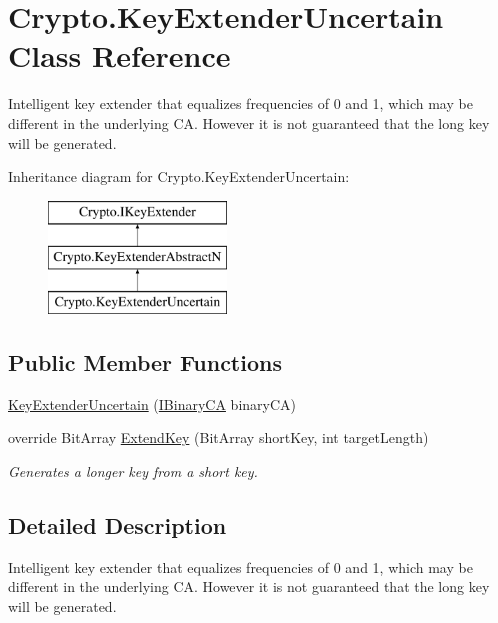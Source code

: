 \hypertarget{class_crypto_1_1_key_extender_uncertain}{}\section{Crypto.\+Key\+Extender\+Uncertain Class Reference}
\label{class_crypto_1_1_key_extender_uncertain}


Intelligent key extender that equalizes frequencies of 0 and 1, which may be different in the underlying C\+A. However it is not guaranteed that the long key will be generated.  


Inheritance diagram for Crypto.\+Key\+Extender\+Uncertain\+:\begin{figure}[H]
\begin{center}
\leavevmode
\includegraphics[height=3.000000cm]{class_crypto_1_1_key_extender_uncertain}
\end{center}
\end{figure}
\subsection*{Public Member Functions}
\begin{DoxyCompactItemize}
\item 
\hyperlink{class_crypto_1_1_key_extender_uncertain_aace64d24b92154a9e01002ee13e0b891}{Key\+Extender\+Uncertain} (\hyperlink{interface_cellular_1_1_i_binary_c_a}{I\+Binary\+C\+A} binary\+C\+A)
\item 
override Bit\+Array \hyperlink{class_crypto_1_1_key_extender_uncertain_a2955df98d2f4831576b12aa9c5ec609d}{Extend\+Key} (Bit\+Array short\+Key, int target\+Length)
\begin{DoxyCompactList}\small\item\em Generates a longer key from a short key. \end{DoxyCompactList}\end{DoxyCompactItemize}


\subsection{Detailed Description}
Intelligent key extender that equalizes frequencies of 0 and 1, which may be different in the underlying C\+A. However it is not guaranteed that the long key will be generated. 



